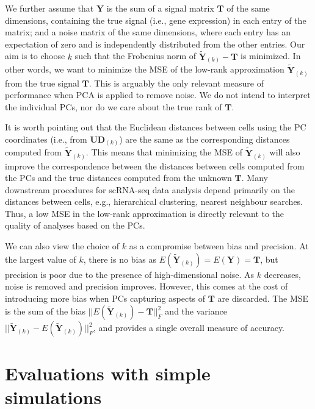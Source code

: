 \documentclass[10pt,letterpaper]{article}
\begin{document}
We further assume that $\mathbf{Y}$ is the sum of a signal matrix $\mathbf{T}$ of the same dimensions, 
containing the true signal (i.e., gene expression) in each entry of the matrix;
and a noise matrix of the same dimensions, where each entry has an expectation of zero and is independently distributed from the other entries.
Our aim is to choose $k$ such that the Frobenius norm of $\mathbf{\tilde Y}_{(k)} - \mathbf{T}$ is minimized.
In other words, we want to minimize the MSE of the low-rank approximation $\mathbf{\tilde Y}_{(k)}$ from the true signal $\mathbf{T}$.
This is arguably the only relevant measure of performance when PCA is applied to remove noise.
We do not intend to interpret the individual PCs, nor do we care about the true rank of $\mathbf{T}$.

It is worth pointing out that the Euclidean distances between cells using the PC coordinates (i.e., from $\mathbf{U}\mathbf{D}_{(k)}$) are the same as the corresponding distances computed from $\mathbf{\tilde Y}_{(k)}$.
This means that minimizing the MSE of $\mathbf{\tilde Y}_{(k)}$ will also improve the correspondence between the distances between cells computed from the PCs and the true distances computed from the unknown $\mathbf{T}$.
Many downstream procedures for scRNA-seq data analysis depend primarily on the distances between cells, e.g., hierarchical clustering, nearest neighbour searches.
Thus, a low MSE in the low-rank approximation is directly relevant to the quality of analyses based on the PCs.

We can also view the choice of $k$ as a compromise between bias and precision.
At the largest value of $k$, there is no bias as $E(\mathbf{\tilde Y}_{(k)}) = E(\mathbf{Y}) = \mathbf{T}$, but precision is poor due to the presence of high-dimensional noise.
As $k$ decreases, noise is removed and precision improves.
However, this comes at the cost of introducing more bias when PCs capturing aspects of $\mathbf{T}$ are discarded.
The MSE is the sum of the bias $||E(\mathbf{\tilde Y}_{(k)}) - \mathbf{T}||^2_F$ and the variance $||\mathbf{\tilde Y}_{(k)} - E(\mathbf{\tilde Y}_{(k)})||^2_F$, and provides a single overall measure of accuracy.

\section{Evaluations with simple simulations}
\end{document}
